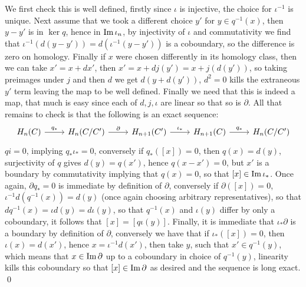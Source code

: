 \documentclass[11pt]{article}
\theoremstyle{definition}
\newcommand{\im}{\text{Im\,}}
\begin{document}
    We first check this is well defined, firstly since \(\iota\) is injective, the choice for \(\iota^{-1}\) is unique. Next assume that we took a different choice \(y'\) for \(y \in q^{-1}(x)\), then \(y-y'\) is in \(\ker q\), hence in \(\im \iota_n\), by injectivity of \(\iota\) and commutativity we find that \(\iota^{-1}(d(y-y')) = d(\iota^{-1}(y-y'))\) is a coboundary, so the difference is zero on homology. Finally if \(x\) were chosen differently in its homology class, then we can take \(x' = x + dx'\), then \(x' = x + dj(y') = x + j(d(y'))\), so taking preimages under \(j\) and then \(d\) we get \(d(y + d(y'))\), \(d^2 = 0\) kills the extraneous \(y'\) term leaving the map to be well defined. Finally we need that this is indeed a map, that much is easy since each of \(d,j,\iota\) are linear so that so is \(\partial\). All that remains to check is that the following is an exact sequence:
    \begin{equation*}
        \begin{tikzcd}
            H_n(C) \arrow[r,"{q_*}"] &H_n(C/C') \arrow[r,"{\partial}"] &H_{n+1}(C') \arrow[r,"{\iota_*}"] &H_{n+1}(C) \arrow[r,"{q_*}"] &H_n(C/C')
        \end{tikzcd}
    \end{equation*}
    \(qi = 0\), implying \(q_*\iota_* = 0\), conversely if \(q_*([x]) = 0\), then \(q(x) = d(y)\), surjectivity of \(q\) gives \(d(y) = q(x')\), hence \(q(x - x') = 0\), but \(x'\) is a boundary by commutativity implying that \(q(x) = 0\), so that \([x] \in \im \iota_*\). Once again, \(\partial q_* = 0\) is immediate by definition of \(\partial\), conversely if \(\partial([x]) = 0\), \(\iota^{-1}d(q^{-1}(x)) = d(y)\) (once again choosing arbitrary representatives), so that \(dq^{-1}(x) = \iota d(y) = d\iota(y)\), so that \(q^{-1}(x)\) and \(\iota(y)\) differ by only a coboundary, it follows that \([x] = [q\iota(y)]\). Finally, it is immediate that \(\iota_* \partial\) is a boundary by definition of \(\partial\), conversely we have that if \(\iota_*([x]) = 0\), then \(\iota(x) = d(x')\), hence \(x = \iota^{-1}d(x')\), then take \(y\), such that \(x' \in q^{-1}(y)\), which means that \(x \in \im \partial\) up to a coboundary in choice of \(q^{-1}(y)\), linearity kills this coboundary so that \([x] \in \im \partial\) as desired and the sequence is long exact. \qed
    
\end{document}
